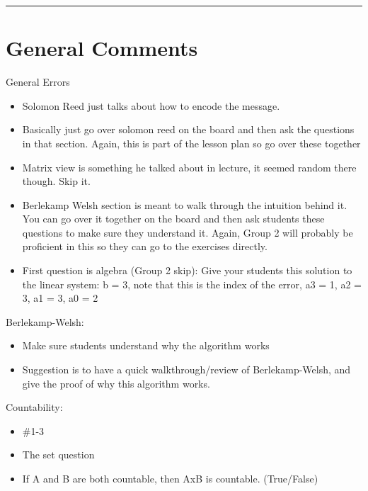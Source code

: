 \documentclass{exam}
\title{}
\date{Berlekamp-Welsh, Countability, Self Reference, Counting}
\begin{document}
\maketitle
\rule{\textwidth}{0.15em}
\fontsize{12}{15}\selectfont
\thispagestyle{empty}


\section{General Comments}
\begin{questions}
\item General Errors
\begin{itemize}
	\item Solomon Reed just talks about how to encode the message.
	\item Basically just go over solomon reed on the board and then ask the questions in that section. Again, this is part of the lesson plan so go over these together
	\item Matrix view is something he talked about in lecture, it seemed random there though. Skip it.
	\item Berlekamp Welsh section is meant to walk through the intuition behind it. You can go over it together on the board and then ask students these questions to make sure they understand it. Again, Group 2 will probably be proficient in this so they can go to the exercises directly.
	\item First question is algebra (Group 2 skip): Give your students this solution to the linear system: b = 3, note that this is the index of the error, a3 = 1, a2 = 3, a1 = 3, a0 = 2
\end{itemize}
\item Berlekamp-Welsh: 
\begin{itemize}
\item Make sure students understand why the algorithm works
\item Suggestion is to have a quick walkthrough/review of Berlekamp-Welsh, and give the proof of why this algorithm works.
\end{itemize}
\item Countability: 
\begin{itemize}
\item \#1-3 
\item The set question
\item If A and B are both countable, then AxB is countable. (True/False)
\end{itemize}

\end{questions}
\end{document}
